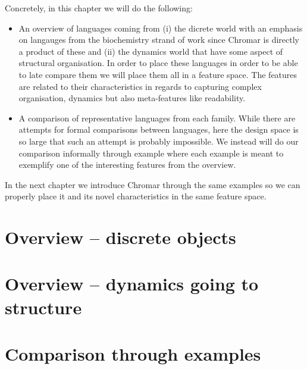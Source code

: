 \documentclass[phd]{infthesis}
\begin{document}
Concretely, in this chapter we will do the following:
\begin{itemize}
\item An overview of languages coming from (i) the dicrete world with an emphasis on
  langauges from the biochemistry strand of work since Chromar is directly a
  product of these and (ii) the dynamics world that have some aspect of
  structural organisation. In order to place these languages in order to be able
  to late compare them we will place them all in a feature space. The features
  are related to their characteristics in regards to capturing complex
  organisation, dynamics but also meta-features like readability.
\item A comparison of representative languages from each family. While there are
  attempts for formal comparisons between languages, here the design space is so
  large that such an attempt is probably impossible. We instead will do our
  comparison informally through example where each example is meant to exemplify
  one of the interesting features from the overview.
\end{itemize}
In the next chapter  we introduce Chromar through the same examples so we can
properly place it and its novel characteristics in the same feature space.
\cite{fontana_barrier_1996}

\section{Overview -- discrete objects}


\section{Overview -- dynamics going to structure}


\section{Comparison through examples}








\singlespace



\printbibliography[heading=bibintoc]

\end{document}
